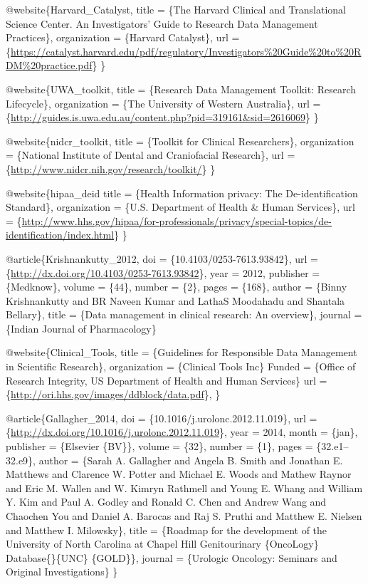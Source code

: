 \documentclass[]{book}
\theoremstyle{definition}
\theoremstyle{definition}
\theoremstyle{definition}
\theoremstyle{remark}
\begin{document}
@website\{Harvard\_Catalyst, title = \{The Harvard Clinical and
Translational Science Center. An Investigators' Guide to Research Data
Management Practices\}, organization = \{Harvard Catalyst\}, url =
\{\url{https://catalyst.harvard.edu/pdf/regulatory/Investigators\%20Guide\%20to\%20RDM\%20practice.pdf}\}
\}

@website\{UWA\_toolkit, title = \{Research Data Management Toolkit:
Research Lifecycle\}, organization = \{The University of Western
Australia\}, url =
\{\url{http://guides.is.uwa.edu.au/content.php?pid=319161\&sid=2616069}\}
\}

@website\{nidcr\_toolkit, title = \{Toolkit for Clinical Researchers\},
organization = \{National Institute of Dental and Craniofacial
Research\}, url = \{\url{http://www.nidcr.nih.gov/research/toolkit/}\}
\}

@website\{hipaa\_deid title = \{Health Information privacy: The
De-identification Standard\}, organization = \{U.S. Department of Health
\& Human Services\}, url =
\{\url{http://www.hhs.gov/hipaa/for-professionals/privacy/special-topics/de-identification/index.html}\}
\}

@article\{Krishnankutty\_2012, doi = \{10.4103/0253-7613.93842\}, url =
\{\url{http://dx.doi.org/10.4103/0253-7613.93842}\}, year = 2012,
publisher = \{Medknow\}, volume = \{44\}, number = \{2\}, pages =
\{168\}, author = \{Binny Krishnankutty and BR Naveen Kumar and LathaS
Moodahadu and Shantala Bellary\}, title = \{Data management in clinical
research: An overview\}, journal = \{Indian Journal of Pharmacology\}

@website\{Clinical\_Tools, title = \{Guidelines for Responsible Data
Management in Scientific Research\}, organization = \{Clinical Tools
Inc\} Funded = \{Office of Research Integrity, US Department of Health
and Human Services\} url =
\{\url{http://ori.hhs.gov/images/ddblock/data.pdf}\}, \}

@article\{Gallagher\_2014, doi = \{10.1016/j.urolonc.2012.11.019\}, url
= \{\url{http://dx.doi.org/10.1016/j.urolonc.2012.11.019}\}, year =
2014, month = \{jan\}, publisher = \{Elsevier \{BV\}\}, volume = \{32\},
number = \{1\}, pages = \{32.e1--32.e9\}, author = \{Sarah A. Gallagher
and Angela B. Smith and Jonathan E. Matthews and Clarence W. Potter and
Michael E. Woods and Mathew Raynor and Eric M. Wallen and W. Kimryn
Rathmell and Young E. Whang and William Y. Kim and Paul A. Godley and
Ronald C. Chen and Andrew Wang and Chaochen You and Daniel A. Barocas
and Raj S. Pruthi and Matthew E. Nielsen and Matthew I. Milowsky\},
title = \{Roadmap for the development of the University of North
Carolina at Chapel Hill Genitourinary \{OncoLogy\}
Database\{\textemdash\}\{UNC\} \{GOLD\}\}, journal = \{Urologic
Oncology: Seminars and Original Investigations\} \}
\end{document}
